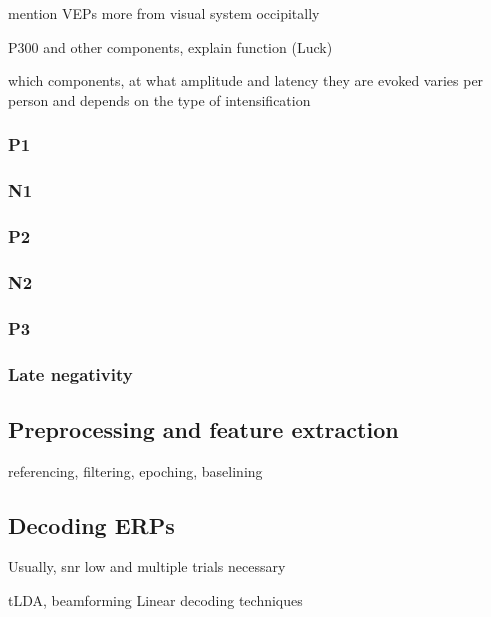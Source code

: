 mention VEPs more from visual system occipitally

P300 and other components, explain function (Luck)


which components, at what amplitude and latency they are evoked varies per
person and depends on the type of intensification

\subsubsection{P1}
\subsubsection{N1}
\subsubsection{P2}
\subsubsection{N2}
\subsubsection{P3}
\subsubsection{Late negativity}

\subsection{Preprocessing and feature extraction}
referencing, filtering, epoching, baselining
\subsection{Decoding ERPs}

Usually, snr low and multiple trials necessary

tLDA, beamforming
Linear decoding techniques
